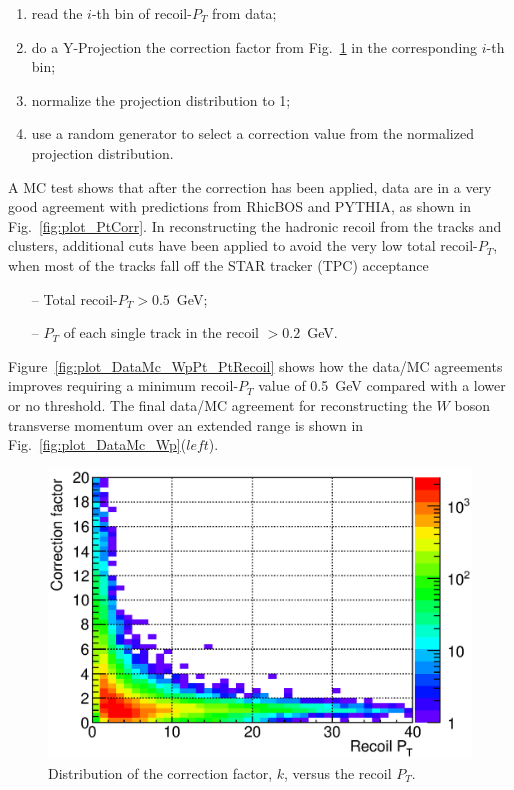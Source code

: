 \documentclass[12pt]{article}
\begin{document}
\begin{enumerate}
   \item read the $i$-th bin of recoil-$P_{T}$ from data;
   \item do a Y-Projection the correction factor from Fig.~\ref{fig:plot_PtCorrFactor} in the corresponding $i$-th bin;
   \item normalize the projection distribution to 1;
   \item use a random generator to select a correction value from the normalized projection distribution.
\end{enumerate}

A MC test shows that after the correction has been applied, data are in a very good agreement with predictions from RhicBOS and PYTHIA, as shown in Fig.~\ref{fig:plot_PtCorr}. In reconstructing the hadronic recoil from the tracks and clusters, additional cuts have been applied to avoid the very low total recoil-$P_{T}$, when most of the tracks fall off the STAR tracker (TPC) acceptance 
\begin{itemize}
   \item[--] Total recoil-$P_{T} > 0.5$~GeV; 
    \item[--] $P_{T}$ of each single track in the recoil $> 0.2$~GeV. 
\end{itemize}
Figure~\ref{fig:plot_DataMc_WpPt_PtRecoil} shows how the data/MC agreements improves requiring a minimum recoil-$P_{T}$ value of 0.5~GeV compared with a lower or no threshold.
The final data/MC agreement for reconstructing the $W$ boson transverse momentum over an extended range is  shown in Fig.~\ref{fig:plot_DataMc_Wp}($left$).

\begin{figure}[htbp]
\begin{center}
\includegraphics[scale=0.8]{images/plot_PtCorrFactor}
\end{center}
\caption{Distribution of the correction factor, $k$, versus the recoil $P_{T}$.}
\label{fig:plot_PtCorrFactor} 
\end{figure}
\end{document}
